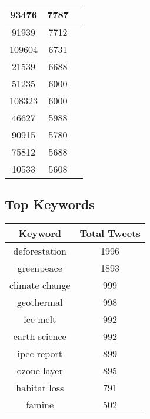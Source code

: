 \documentclass{article}\usepackage[T1]{fontenc}
\begin{document}
\begin{tabular}{|c|c|c|}
 \hline
93476 & 7787\\ 
 \hline
91939 & 7712\\ 
 \hline
109604 & 6731\\ 
 \hline
21539 & 6688\\ 
 \hline
51235 & 6000\\ 
 \hline
108323 & 6000\\ 
 \hline
46627 & 5988\\ 
 \hline
90915 & 5780\\ 
 \hline
75812 & 5688\\ 
 \hline
10533 & 5608\\ 
 \hline
\end{tabular}\subsection*{Top Keywords}\begin{tabular}{|c|c|}         \hline         Keyword & Total Tweets \\ 
 \hline
deforestation & 1996\\ 
 \hline
greenpeace & 1893\\ 
 \hline
climate change & 999\\ 
 \hline
geothermal & 998\\ 
 \hline
ice melt & 992\\ 
 \hline
earth science & 992\\ 
 \hline
ipcc report & 899\\ 
 \hline
ozone layer & 895\\ 
 \hline
habitat loss & 791\\ 
 \hline
famine & 502\\ 
 \hline
\end{tabular}
\end{document}
